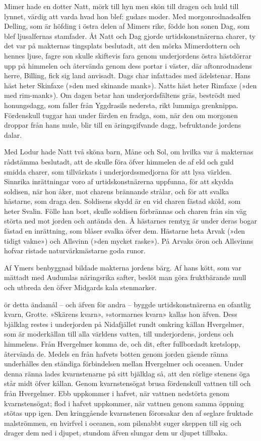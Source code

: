 Mimer hade en dotter Natt, mörk till hyn men skön till dragen och huld
till lynnet, värdig att varda hvad hon blef: gudars moder. Med
morgonrodnadsalfen Delling, som är höfding i östra delen af Mimers rike,
födde hon sonen Dag, som blef ljusalfernas stamfader. Åt Natt och Dag
gjorde urtidskonstnärerna charer, ty det var på makternas tingsplats
beslutadt, att den mörka Mimerdottern och hennes ljuse, fagre son skulle
skiftevis fara genom underjordens östra hästdörrar upp på himmelen och
återvända genom dess portar i väster, där aftonrodnadens herre, Billing,
fick sig land anvisadt. Dags char infattades med ädelstenar. Hans häst
heter Skinfaxe (»den med skinande mank»). Natts häst heter Rimfaxe (»den
med rim-mank»). Om dagen betar han underjordsfältens gräs, beströdt med
honungsdagg, som faller från Yggdrasils nedersta, rikt lummiga
grenknippa. Fördenskull tuggar han under färden en fradga, som, när den
om morgonen droppar från hans mule, blir till en äringsgifvande dagg,
befruktande jordens dalar.

Med Lodur hade Natt två sköna barn, Måne och Sol, om hvilka var å
makternas rådstämma beslutadt, att de skulle föra öfver himmelen de af
eld och guld smidda charer, som tillvärkats i underjordssmedjorna för
att lysa världen. Sinnrika inrättningar voro af urtidskonstnärerna
uppfunna, för att skydda soldisen, när hon åker, mot charens brännande
strålar, och för att svalka hästarne, som draga den. Soldisens skydd är
en vid charen fästad sköld, som heter Svalin. Fölle han bort, skulle
soldisen förbrännas och charen från sin väg störta ned mot jorden och
antända den. Å hästarnes remtyg är under deras bogar fästad en
inrättning, som blåser svalka öfver dem. Hästarne heta Arvak (»den
tidigt vakne») och Allsvinn (»den mycket raske»). På Arvaks öron och
Allsvinns hofvar ristade naturvärkmästarne goda runor.

Af Ymers benbyggnad bildade makterna jordens bärg. Af hans kött, som var
mättadt med Audumlas näringsrika safter, beslöt man göra fruktbärande
mull och utbreda den öfver Midgards kala stenmarker.

\endSecII


\dropcapF ör detta ändamål -- och äfven för andra -- byggde urtidskonstnärerna en
ofantlig kvarn, Grotte. »Skärens kvarn», »stormarnes kvarn» kallas hon
äfven. Dess bjälklag restes i underjorden på Nidafjället rundt omkring
källan Hvergelmer, som är moderkällan till alla världens vatten, till
underjordens, jordens och himmelens. Från Hvergelmer komma de, och dit,
efter fullbordadt kretslopp, återvända de. Medels en från hafvets botten
genom jorden gående ränna underhålles den ständiga förbindelsen mellan
Hvergelmer och oceanen. Under denna ränna lades kvarnstenarne på sitt
bjälklag så, att den rörlige stenens öga står midt öfver källan. Genom
kvarnstensögat brusa fördenskull vattnen till och från Hvergelmer. Ebb
uppkommer i hafvet, när vattnen nedstörta
genom kvarnstensögat; flod i hafvet uppkommer, när vattnen genom samma
öppning stötas upp igen. Den kringgående kvarnstenen förorsakar den af
seglare fruktade malströmmen, en hvirfvel i oceanen, som pilsnabbt suger
skeppen till sig och drager dem ned i djupet, stundom äfven slungar dem
ur djupet tillbaka.

